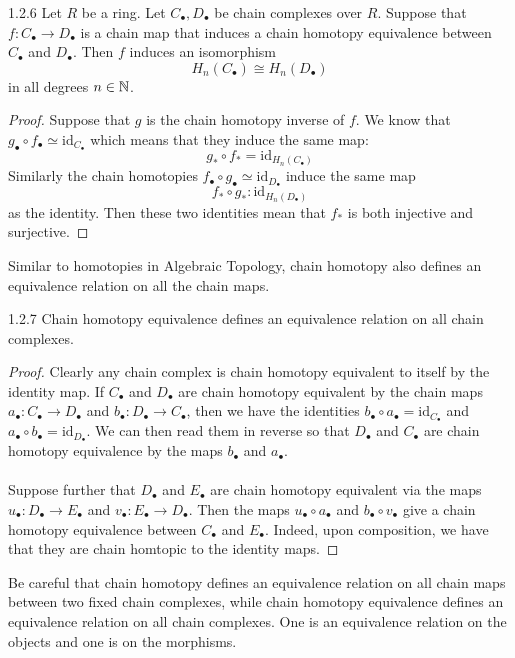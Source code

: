 \documentclass[a4paper]{article}
\begin{document}
\begin{lmm}{}{1.2.6} Let $R$ be a ring. Let $C_\bullet,D_\bullet$ be chain complexes over $R$. Suppose that $f:C_\bullet\to D_\bullet$ is a chain map that induces a chain homotopy equivalence between $C_\bullet$ and $D_\bullet$. Then $f$ induces an isomorphism $$H_n(C_\bullet)\cong H_n(D_\bullet)$$ in all degrees $n\in\mathbb{N}$. \tcbline
\begin{proof}
Suppose that $g$ is the chain homotopy inverse of $f$. We know that $g_\bullet\circ f_\bullet\simeq\text{id}_{C_\bullet}$ which means that they induce the same map: $$g_\ast\circ f_\ast=\text{id}_{H_n(C_\bullet)}$$ Similarly the chain homotopies $f_\bullet\circ g_\bullet\simeq\text{id}_{D_\bullet}$ induce the same map $$f_\ast\circ g_\ast:\text{id}_{H_n(D_\bullet)}$$ as the identity. Then these two identities mean that $f_\ast$ is both injective and surjective. 
\end{proof}
\end{lmm}

Similar to homotopies in Algebraic Topology, chain homotopy also defines an equivalence relation on all the chain maps. 

\begin{prp}{}{1.2.7} Chain homotopy equivalence defines an equivalence relation on all chain complexes. \tcbline
\begin{proof}
Clearly any chain complex is chain homotopy equivalent to itself by the identity map. If $C_\bullet$ and $D_\bullet$ are chain homotopy equivalent by the chain maps $a_\bullet:C_\bullet\to D_\bullet$ and $b_\bullet:D_\bullet\to C_\bullet$, then we have the identities $b_\bullet\circ a_\bullet=\text{id}_{C_\bullet}$ and $a_\bullet\circ b_\bullet=\text{id}_{D_\bullet}$. We can then read them in reverse so that $D_\bullet$ and $C_\bullet$ are chain homotopy equivalence by the maps $b_\bullet$ and $a_\bullet$. \\~\\

Suppose further that $D_\bullet$ and $E_\bullet$ are chain homotopy equivalent via the maps $u_\bullet:D_\bullet\to E_\bullet$ and $v_\bullet:E_\bullet\to D_\bullet$. Then the maps $u_\bullet\circ a_\bullet$ and $b_\bullet\circ v_\bullet$ give a chain homotopy equivalence between $C_\bullet$ and $E_\bullet$. Indeed, upon composition, we have that they are chain  homtopic to the identity maps. 
\end{proof}
\end{prp}

Be careful that chain homotopy defines an equivalence relation on all chain maps between two fixed chain complexes, while chain homotopy equivalence defines an equivalence relation on all chain complexes. One is an equivalence relation on the objects and one is on the morphisms. \\~\\
\end{document}
